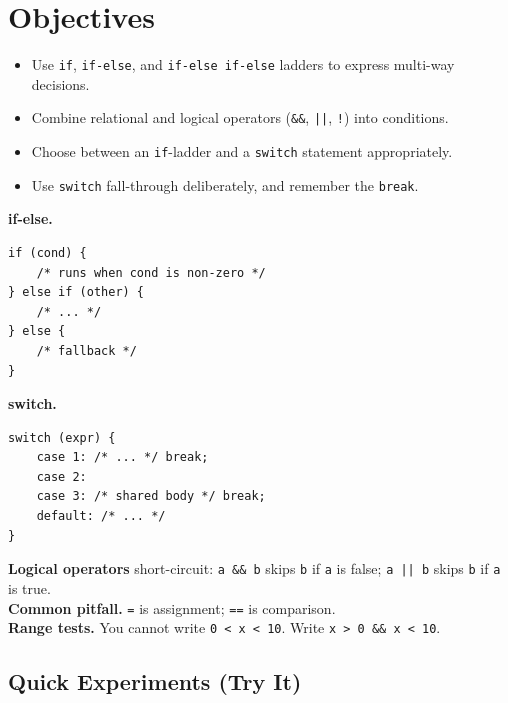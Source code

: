 \documentclass[11pt]{article}
\begin{document}
\labheader

\section*{Objectives}
\begin{itemize}[leftmargin=*,nosep]
  \item Use \texttt{if}, \texttt{if-else}, and \texttt{if-else if-else} ladders to express multi-way decisions.
  \item Combine relational and logical operators (\texttt{\&\&}, \texttt{||}, \texttt{!}) into conditions.
  \item Choose between an \texttt{if}-ladder and a \texttt{switch} statement appropriately.
  \item Use \texttt{switch} fall-through deliberately, and remember the \texttt{break}.
\end{itemize}

\begin{summary}
\textbf{if-else.}
\begin{lstlisting}
if (cond) {
    /* runs when cond is non-zero */
} else if (other) {
    /* ... */
} else {
    /* fallback */
}
\end{lstlisting}

\textbf{switch.}
\begin{lstlisting}
switch (expr) {
    case 1: /* ... */ break;
    case 2:
    case 3: /* shared body */ break;
    default: /* ... */
}
\end{lstlisting}

\textbf{Logical operators} short-circuit:
\texttt{a \&\& b} skips \texttt{b} if \texttt{a} is false; \texttt{a || b} skips \texttt{b} if \texttt{a} is true.\\
\textbf{Common pitfall.} \texttt{=} is assignment; \texttt{==} is comparison.\\
\textbf{Range tests.} You cannot write \texttt{0 < x < 10}. Write \texttt{x > 0 \&\& x < 10}.
\end{summary}

\subsection*{Quick Experiments (Try It)}
\end{document}
